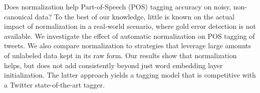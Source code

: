 Does normalization help Part-of-Speech (POS) tagging accuracy on noisy, non-canonical data? To the best of our knowledge, little is known on the actual impact of normalization in a real-world scenario, where gold error detection is not available.  We investigate the effect of automatic normalization on POS tagging of tweets. We also compare normalization to strategies that leverage large amounts of unlabeled data kept in its raw form.  Our results show that normalization helps, but does not add  consistently beyond just word embedding layer initialization. The latter approach yields a tagging model that is competitive with a Twitter state-of-the-art tagger.
